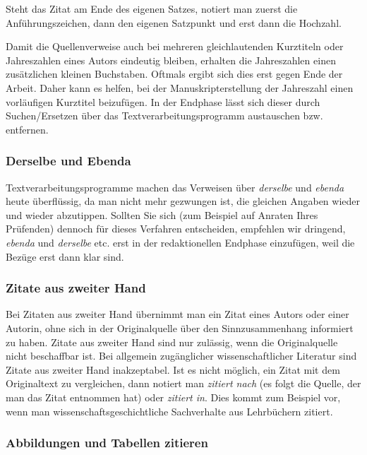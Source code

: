 \documentclass[a4paper,11pt]{article}%
\renewcommand{\\}{\vspace*{0.5\baselineskip} \newline}
\begin{document}
Steht das Zitat am Ende des eigenen Satzes, notiert man zuerst die Anführungszeichen, dann den eigenen Satzpunkt und erst dann die Hochzahl.\\

Damit die Quellenverweise auch bei mehreren gleichlautenden Kurztiteln oder Jahreszahlen eines Autors eindeutig bleiben, erhalten die Jahreszahlen einen zusätzlichen kleinen Buchstaben. Oftmals ergibt sich dies erst gegen Ende der Arbeit. Daher kann es helfen, bei der Manuskripterstellung der Jahreszahl einen vorläufigen Kurztitel beizufügen. In der Endphase lässt sich dieser durch Suchen/Ersetzen über das Textverarbeitungsprogramm austauschen bzw. entfernen.



\subsubsection{Derselbe und Ebenda}

Textverarbeitungsprogramme machen das Verweisen über \textit{derselbe} und \textit{ebenda} heute überflüssig, da man nicht mehr gezwungen ist, die gleichen Angaben wieder und wieder abzutippen. Sollten Sie sich (zum Beispiel auf Anraten Ihres Prüfenden) dennoch für dieses Verfahren entscheiden, empfehlen wir dringend, \textit{ebenda} und \textit{derselbe} etc. erst in der redaktionellen Endphase einzufügen, weil die Bezüge erst dann klar sind. 



\subsubsection{Zitate aus zweiter Hand}

Bei Zitaten aus zweiter Hand übernimmt man ein Zitat eines Autors oder einer Autorin, ohne sich in der Originalquelle über den Sinnzusammenhang informiert zu haben. Zitate aus zweiter Hand sind nur zulässig, wenn die Originalquelle nicht beschaffbar ist. Bei allgemein zugänglicher wissenschaftlicher Literatur sind Zitate aus zweiter Hand inakzeptabel. Ist es nicht möglich, ein Zitat mit dem Originaltext zu vergleichen, dann notiert man \textit{zitiert nach} (es folgt die Quelle, der man das Zitat entnommen hat) oder \textit{zitiert in}. Dies kommt zum Beispiel vor, wenn man wissenschaftsgeschichtliche Sachverhalte aus Lehrbüchern zitiert.



\subsubsection{Abbildungen und Tabellen zitieren}
\end{document}
